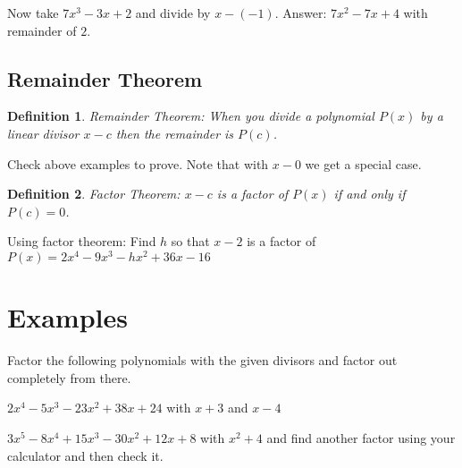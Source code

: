 \documentclass{tufte-handout}
\newtheorem{mydef}{Definition}
\begin{document}
Now take $7x^3-3x+2$ and divide by $x-(-1)$.  Answer: $7x^2-7x+4$ with remainder of $2$.

\subsection{Remainder Theorem}

\begin{mydef}
Remainder Theorem: When you divide a polynomial $P(x)$ by a linear divisor $x-c$ then the remainder is $P(c)$.
\end{mydef}

Check above examples to prove.  Note that with $x-0$ we get a special case.

\begin{mydef}
Factor Theorem: $x-c$ is a factor of $P(x)$ if and only if $P(c) = 0$.
\end{mydef}

Using factor theorem: Find $h$ so that $x-2$ is a factor of $P(x) = 2x^4 - 9x^3 - h x^2 + 36x-16$

\section{Examples}
Factor the following polynomials with the given divisors and factor out completely from there.

$2 x^4-5 x^3-23 x^2+38 x+24$ with $x+3$ and $x-4$

$3 x^5-8 x^4+15 x^3-30 x^2+12 x+8$ with $x^2+4$ and find another factor using your calculator and then check it.
\end{document}
